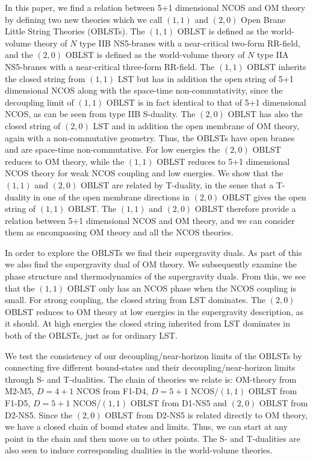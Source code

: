 \documentclass[a4paper,twoside,titlepage,12pt]{article}
\begin{document}
In this paper, we find a relation between 5+1 dimensional NCOS
and OM theory by defining two new theories which we call
$(1,1)$ and $(2,0)$ Open Brane Little String Theories (OBLSTs).
The $(1,1)$ OBLST is defined as the world-volume theory
of $N$ type IIB NS5-branes with a near-critical two-form RR-field,
and the $(2,0)$ OBLST is defined as the world-volume theory
of $N$ type IIA NS5-branes with a near-critical three-form RR-field.
The $(1,1)$ OBLST inherits the closed string from $(1,1)$ LST
but has in addition the open string of 5+1 dimensional NCOS
along with the space-time non-commutativity,
since the decoupling limit of $(1,1)$ OBLST is in fact identical
to that of 5+1 dimensional NCOS, as can be seen from type IIB S-duality.
The $(2,0)$ OBLST has also the closed string of $(2,0)$ LST and
in addition the open membrane of OM theory, again with a
non-commutative geometry. 
Thus, the OBLSTs have open branes and are space-time non-commutative.
For low energies the $(2,0)$ OBLST reduces to OM theory,
while the $(1,1)$ OBLST reduces to 5+1 dimensional NCOS theory
for weak NCOS coupling and low energies.
We show that the $(1,1)$ and $(2,0)$ OBLST are related by T-duality,
in the sense that a T-duality in one of the open membrane directions
in $(2,0)$ OBLST gives the open string of $(1,1)$ OBLST.
The $(1,1)$ and $(2,0)$ OBLST therefore provide a
relation between 5+1 dimensional NCOS and OM theory, and
we can consider them as encompassing OM theory and all the NCOS theories.


In order to explore the OBLSTs we find their supergravity duals.
As part of this we also find the supergravity dual of OM theory.
We subsequently examine the phase structure and thermodynamics of 
the supergravity duals.
From this, we see that the $(1,1)$ OBLST only has an NCOS phase
when the NCOS coupling is small. 
For strong coupling, the closed string from LST dominates.
The $(2,0)$ OBLST reduces to OM theory at low energies
in the supergravity description, as it should.
At high energies the closed string inherited from
LST dominates in both of the OBLSTs, just as for ordinary LST.


We test the consistency of our decoupling/near-horizon 
limits of the OBLSTs by connecting five different bound-states
and their decoupling/near-horizon limits through S- and T-dualities.
The chain of theories we relate is: OM-theory from M2-M5, $D=4+1$ NCOS from
F1-D4, $D=5+1$ NCOS/$(1,1)$ OBLST from F1-D5, $D=5+1$ NCOS/$(1,1)$ OBLST
from D1-NS5 and $(2,0)$ OBLST from D2-NS5. Since the $(2,0)$ OBLST
from D2-NS5 is related directly to OM theory, we have a closed chain
of bound states and limits.
Thus, we can start at any point in the chain and then move on to
other points. 
The S- and T-dualities are also seen to induce corresponding dualities
in the world-volume theories.
\end{document}
